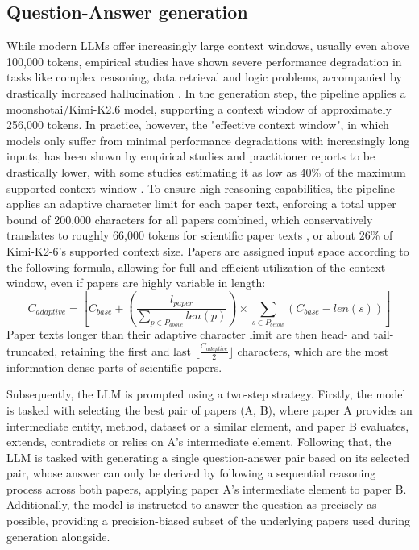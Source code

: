 \subsection{Question-Answer generation}
While modern LLMs offer increasingly large context windows, usually even above 100,000 tokens, empirical studies have shown severe performance degradation in tasks like complex reasoning, data retrieval and logic problems, accompanied by drastically increased hallucination \cite{contextIsWhatYouNeed}. In the generation step, the pipeline applies a moonshotai/Kimi-K2.6 \cite{moonshotKimi2.6} model, supporting a context window of approximately 256,000 tokens. In practice, however, the "effective context window", in which models only suffer from minimal performance degradations with increasingly long inputs, has been shown by empirical studies \cite{ruler} and practitioner reports to be drastically lower, with some studies estimating it as low as 40\% of the maximum supported context window \cite{intelligenceDegredation}. To ensure high reasoning capabilities, the pipeline applies an adaptive character limit for each paper text, enforcing a total upper bound of 200,000 characters for all papers combined, which conservatively translates to roughly 66,000 tokens for scientific paper texts \cite{howLongIsAPieceOfString}, or about 26\% of Kimi-K2-6's supported context size.
Papers are assigned input space according to the following formula, allowing for full and efficient utilization of the context window, even if papers are highly variable in length:
\begin{equation}
C_{adaptive} = \left\lfloor C_{base} + \left( \frac{l_{paper}}{\sum_{p \in P_{above}} len(p)} \right) \times \sum_{s \in P_{below}} (C_{base} - len(s)) \right\rfloor
\end{equation}
Paper texts longer than their adaptive character limit are then head- and tail-truncated, retaining the first and last $\lfloor\frac{C_{adaptive}}{2}\rfloor$ characters, which are the most information-dense parts of scientific papers.

Subsequently, the LLM is prompted using a two-step strategy. Firstly, the model is tasked with selecting the best pair of papers (A, B), where paper A provides an intermediate entity, method, dataset or a similar element, and paper B evaluates, extends, contradicts or relies on A's intermediate element. Following that, the LLM is tasked with generating a single question-answer pair based on its selected pair, whose answer can only be derived by following a sequential reasoning process across both papers, applying paper A's intermediate element to paper B. Additionally, the model is instructed to answer the question as precisely as possible, providing a precision-biased subset of the underlying papers used during generation alongside.

